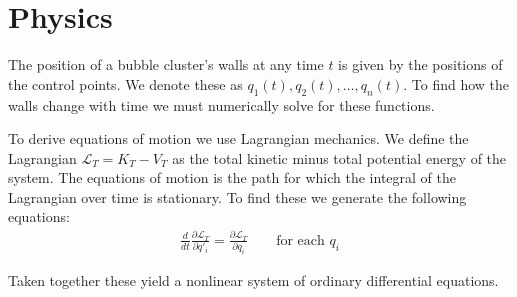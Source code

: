 \documentclass{article}
\begin{document}
\section{Physics}
The position of a bubble cluster's walls at any time $t$ is given by the
positions of the control points. We denote these as
$q_1(t),q_2(t),\dots,q_n(t)$. To find how the walls change with time we must
numerically solve for these functions.

To derive equations of motion we use Lagrangian mechanics. We define the
Lagrangian $\mathcal{L}_T=K_T-V_T$ as the total kinetic minus total potential
energy of the system. The equations of motion is the path for which the
integral of the Lagrangian over time is stationary. To find these we generate
the following equations:
\begin{align}
\frac{d}{d t}\frac{\partial \mathcal{L}_T}{\partial q'_i}
=\frac{\partial
\mathcal{L}_T}{\partial q_i} \qquad \text{for each } q_i
\end{align} 

Taken together these yield a nonlinear system of ordinary differential
equations.
\end{document}
